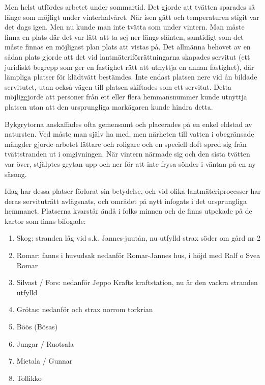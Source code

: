 Men helst utfördes arbetet under sommartid. Det gjorde att tvätten sparades så länge som möjligt under vinterhalvåret. När isen gått och temperaturen stigit var det dags igen. Men nu kunde man inte tvätta som under vintern. Man måste finna en plats där det var lätt att ta sej ner längs slänten, samtidigt som det måste finnas en möjligast plan plats att vistas på. Det allmänna behovet av en sådan plats gjorde att det vid lantmäteriförrättningarna skapades servitut (ett juridiskt begrepp som ger en fastighet rätt att utnyttja en annan fastighet), där lämpliga platser för klädtvätt bestämdes. Inte endast platsen nere vid ån bildade servitutet, utan också vägen till platsen skiftades som ett servitut. Detta möjliggjorde att personer från ett eller flera hemmansnummer kunde utnyttja platsen utan att den ursprungliga markägaren kunde hindra detta.

Bykgrytorna anskaffades ofta gemensamt och placerades på en enkel eldstad av natursten. Ved måste man själv ha med, men närheten till vatten i obegränsade mängder gjorde arbetet lättare och roligare och en speciell doft spred sig från tvättstranden ut i omgivningen. När vintern närmade sig och den sista tvätten var över, stjälptes grytan upp och ner för att inte frysa sönder i väntan på en ny säsong.

Idag har dessa platser förlorat sin betydelse, och vid olika lantmäteriprocesser har deras servituträtt avlägsnats, och området på nytt infogats i det ursprungliga hemmanet. Platserna kvarstår ändå i folks minnen och de finns utpekade på de kartor som finns bifogade:

\begin{enumerate}
  \item Skog: stranden låg vid s.k. Jannes-juutån, nu utfylld strax söder om gård nr 2
  \item Romar: fanns i huvudsak nedanför Romar-Jannes hus, i höjd med Ralf o Svea Romar
  \item Silvast / Fors: nedanför Jeppo Krafts kraftstation, nu är den vackra stranden utfylld
  \item Grötas: nedanför och strax norrom torkrian
  \item Böös (Bösas)
  \item Jungar / Ruotsala
  \item Mietala / Gunnar
  \item Tollikko
\end{enumerate}




